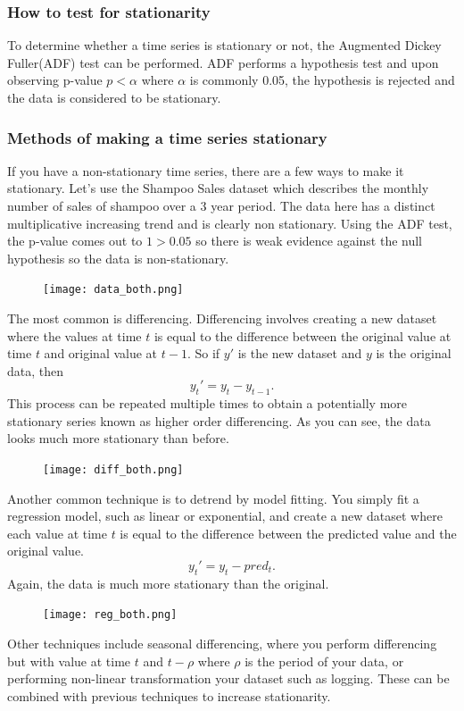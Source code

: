 \documentclass{article}
\begin{document}
  \subsubsection{How to test for stationarity}
    To determine whether a time series is stationary or not, the Augmented Dickey Fuller(ADF) test can be performed. ADF performs a hypothesis test and upon observing p-value $p < \alpha$ where $\alpha$ is commonly 0.05, the hypothesis is rejected and the data is considered to be stationary.

  \subsubsection{Methods of making a time series stationary}
    If you have a non-stationary time series, there are a few ways to make it stationary. Let's use the Shampoo Sales dataset which describes the monthly number of sales of shampoo over a 3 year period.
    The data here has a distinct multiplicative increasing trend and is clearly non stationary. Using the ADF test, the p-value comes out to $1>0.05$ so there is weak evidence against the null hypothesis so the data is non-stationary.
    \begin{figure}[H]
      \texttt{[image: data\_both.png]}
    \end{figure}
    The most common is differencing. Differencing involves creating a new dataset where the values at time $t$ is equal to the difference between the original value at time $t$ and original value at $t-1$. So if $y'$ is the new dataset and $y$ is the original data, then
    \begin{equation}
      y_t' = y_t - y_{t-1}.
    \end{equation}
    This process can be repeated multiple times to obtain a potentially more stationary series known as higher order differencing. As you can see, the data looks much more stationary than before.
    \begin{figure}[H]
      \centering
      \texttt{[image: diff\_both.png]}
    \end{figure}
    Another common technique is to detrend by model fitting. You simply fit a regression model, such as linear or exponential, and create a new dataset where each value at time $t$ is equal to the difference between the predicted value and the original value. 
    \begin{equation}
      y_t' = y_t - pred_t.
    \end{equation}
    Again, the data is much more stationary than the original.
    \begin{figure}[H]
      \centering
      \texttt{[image: reg\_both.png]}
    \end{figure}
    Other techniques include seasonal differencing, where you perform differencing but with value at time $t$ and $t-\rho$ where $\rho$ is the period of your data, or performing non-linear transformation your dataset such as logging. These can be combined with previous techniques to increase stationarity.
  \newpage
\end{document}
